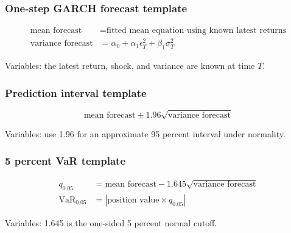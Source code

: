 \documentclass[
  8pt,
  twocolumn]{extarticle}
\begin{document}
\subsubsection{One-step GARCH forecast
template}\label{one-step-garch-forecast-template}

\[
\begin{aligned}
\text{mean forecast}&=\text{fitted mean equation using known latest returns}\\
\text{variance forecast}&=\alpha_0+\alpha_1\epsilon_T^2+\beta_1\sigma_T^2
\end{aligned}
\]

Variables: the latest return, shock, and variance are known at time
\(T\).

\subsubsection{Prediction interval
template}\label{prediction-interval-template}

\[
\text{mean forecast}\pm1.96\sqrt{\text{variance forecast}}
\]

Variables: use 1.96 for an approximate 95 percent interval under
normality.

\subsubsection{5 percent VaR template}\label{percent-var-template}

\[
\begin{aligned}
q_{0.05}&=\text{mean forecast}-1.645\sqrt{\text{variance forecast}}\\
\operatorname{VaR}_{0.05}&=|\text{position value}\times q_{0.05}|
\end{aligned}
\]

Variables: 1.645 is the one-sided 5 percent normal cutoff.
\end{document}

